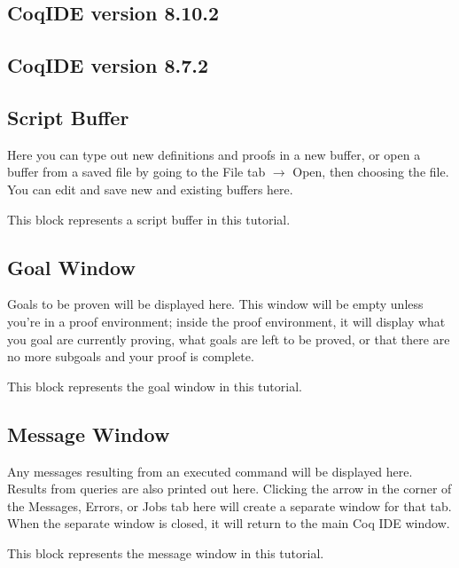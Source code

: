 



\subsection{CoqIDE version 8.10.2}
	






\subsection{CoqIDE version 8.7.2}
	





\subsection{Script Buffer}
Here you can type out new definitions and proofs in a new buffer, or open a buffer from a saved file by going to the File tab $\to$ Open, then choosing the file. 
You can edit and save new and existing buffers here. 
\begin{code} 
	This block represents a script buffer in this tutorial. 
\end{code}



\subsection{Goal Window}
Goals to be proven will be displayed here. 
This window will be empty unless you're in a proof environment; inside the proof environment, it will display what you goal are currently proving, what goals are left to be proved, or that there are no more subgoals and your proof is complete.
\begin{goal} 
	This block represents the goal window in this tutorial. 
\end{goal}



\subsection{Message Window}
Any messages resulting from an executed command will be displayed here. 
Results from queries are also printed out here. 
Clicking the arrow in the corner of the Messages, Errors, or Jobs tab here will create a separate window for that tab. 
When the separate window is closed, it will return to the main Coq IDE window. 
\begin{msg} 
	This block represents the message window in this tutorial. 
\end{msg}















